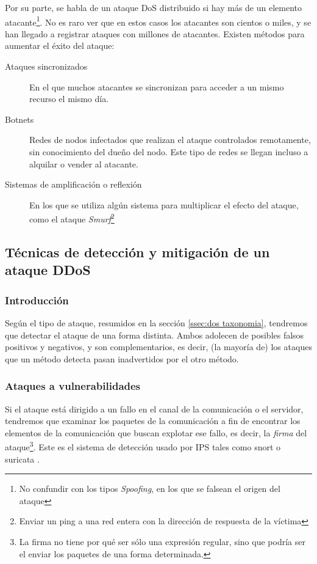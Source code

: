 Por su parte, se habla de un ataque \gls{DoS} distribuido si hay más de un elemento 
atacante\footnote{No confundir con los tipos \emph{Spoofing}, en los que se falsean el origen del ataque}. 
No es raro ver que en estos casos los atacantes son cientos o miles, y se han llegado a registrar ataques 
con millones de atacantes. Existen métodos para aumentar el éxito del ataque:
\begin{description}
  \item[Ataques sincronizados] En el que muchos atacantes se sincronizan para acceder a un mismo recurso el
  mismo día.
  \item[Botnets] Redes de nodos infectados que realizan el ataque controlados remotamente, sin conocimiento del
  dueño del nodo. Este tipo de redes se llegan incluso a alquilar o vender al atacante.
  \item[Sistemas de amplificación o reflexión] En los que se utiliza algún sistema para multiplicar el efecto del ataque,
  como el ataque \emph{Smurf}\footnote{Enviar un ping a una red entera con la dirección de respuesta 
  de la víctima}
\end{description}

\subsection{Técnicas de detección y mitigación de un ataque DDoS}\label{sec:dos Deteccion y mitigacion}
\subsubsection{Introducción}
Según el tipo de ataque, resumidos en la sección \ref{ssec:dos taxonomia}, tendremos que 
detectar el ataque de una forma distinta. Ambos adolecen de posibles falsos positivos y negativos,
y son complementarios, es decir, (la mayoría de) los ataques que un método detecta pasan inadvertidos
por el otro método.

\subsubsection{Ataques a vulnerabilidades}
Si el ataque está dirigido a un fallo en el canal de la comunicación o el servidor,
tendremos que examinar los paquetes de la comunicación a fin de encontrar los elementos de la
comunicación que buscan explotar ese fallo, es decir, la \emph{firma} del ataque\footnote{La firma no tiene
por qué ser sólo una expresión regular, sino que podría ser el enviar los paquetes de una forma determinada.}.
Este es el sistema de detección usado por IPS tales como snort \cite{snort} o suricata \cite{suricata}.

